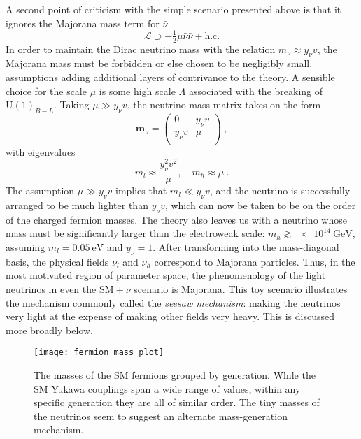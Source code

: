 A second point of criticism with the simple scenario presented above is that it
ignores the Majorana mass term for $\bar{\nu}$
\begin{equation}
  \mathscr{L} \supset - \tfrac{1}{2} \mu \bar{\nu} \bar{\nu} + \text{h.c.}
\end{equation}
In order to maintain the Dirac neutrino mass with the relation
$m_{\nu} \approx y_{\nu}v$, the Majorana mass must be forbidden or else chosen
to be negligibly small, assumptions adding additional layers of contrivance to
the theory. A sensible choice for the scale $\mu$ is some high scale $\Lambda$
associated with the breaking of $\mathrm{U}(1)_{B-L}$. Taking
$\mu \gg y_{\nu} v$, the neutrino-mass matrix takes on the form
\begin{equation}
  \mathbf{m}_{\nu} = \begin{pmatrix}
    0 & y_{\nu} v \\
    y_{\nu} v & \mu \\
  \end{pmatrix} \ ,
\end{equation}
with eigenvalues
\begin{equation}
  m_{l} \approx \frac{y_{\nu}^{2}v^{2}}{\mu},\quad m_{h} \approx \mu \ .
\end{equation}
The assumption $\mu \gg y_{\nu} v$ implies that $m_{l} \ll y_{\nu} v$, and the
neutrino is successfully arranged to be much lighter than $y_{\nu} v$, which can
now be taken to be on the order of the charged fermion masses. The theory also
leaves us with a neutrino whose mass must be significantly larger than the
electroweak scale: $m_{h} \gtrsim \SI{e14}{\GeV}$, assuming
$m_{l} = \SI{0.05}{\eV}$ and $y_{\nu} = 1$. After transforming into the
mass-diagonal basis, the physical fields $\nu_{l}$ and $\nu_{h}$ correspond to
Majorana particles. Thus, in the most motivated region of parameter space, the
phenomenology of the light neutrinos in even the $\text{SM} + \bar{\nu}$
scenario is Majorana. This toy scenario illustrates the mechanism commonly
called the \textit{seesaw mechanism}: making the neutrinos very light at the
expense of making other fields very heavy. This is discussed more broadly below.

\begin{figure}[t]
  \centering
  \texttt{[image: fermion\_mass\_plot]}
  \caption[The masses of the SM fermions grouped by generation.]{The masses of
    the SM fermions grouped by generation. While the SM Yukawa couplings span a
    wide range of values, within any specific generation they are all of similar
    order. The tiny masses of the neutrinos seem to suggest an alternate
    mass-generation mechanism.}
  \label{fig:ch1-fermion-masses}
\end{figure}

